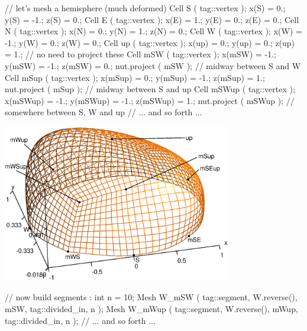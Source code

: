    // let's mesh a hemisphere (much deformed)
   Cell S ( tag::vertex );    x(S)  =   0.;   y(S)  =  -1.;   z(S)  =  0.;
   Cell E ( tag::vertex );    x(E)  =   1.;   y(E)  =   0.;   z(E)  =  0.;
   Cell N ( tag::vertex );    x(N)  =   0.;   y(N)  =   1.;   z(N)  =  0.;
   Cell W ( tag::vertex );    x(W)  =  -1.;   y(W)  =   0.;   z(W)  =  0.;
   Cell up ( tag::vertex );   x(up) =   0.;   y(up) =   0.;   z(up) =  1.;
   // no need to project these
   Cell mSW ( tag::vertex );  x(mSW) = -1.;   y(mSW) = -1.;   z(mSW) = 0.;
   nut.project ( mSW );  // midway between S and W
   Cell mSup  ( tag::vertex );  x(mSup) =  0.;   y(mSup) = -1.;   z(mSup) = 1.;
   nut.project ( mSup );  // midway between S and up
   Cell mSWup ( tag::vertex );  x(mSWup) = -1.;  y(mSWup) = -1.;  z(mSWup) = 1.;
   nut.project ( mSWup );  // somewhere between S, W and up
   // ... and so forth ...
\endverbatim
	
{ 
\centerline{\includegraphics[width=10cm]{hemisphere-2.eps}} }

\verbatim
   // now build segments :
   int n = 10;
   Mesh W_mSW  ( tag::segment, W.reverse(), mSW,  tag::divided_in, n );
   Mesh W_mWup ( tag::segment, W.reverse(), mWup, tag::divided_in, n );
   // ... and so forth ...

